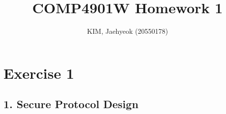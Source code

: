\documentclass[runningheads]{llncs}
\begin{document}
\pagestyle{headings}
\mainmatter
\def\ECCV16SubNumber{***}  %

\title{COMP4901W Homework 1} %


\author{KIM, Jaehyeok (20550178)}

\maketitle


\section*{Exercise 1}

\subsection*{1. Secure Protocol Design}
\end{document}
